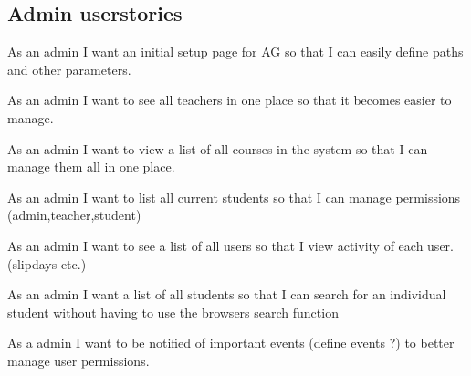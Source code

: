 \begin{appendices}
\begin{itemize*}
\subsection*{Admin userstories}
\item As an admin I want an initial setup page for AG so that I can easily define paths and other parameters.
\item As an admin I want to see all teachers in one place so that it becomes easier to manage.
\item As an admin I want to view a list of all courses in the system so that I can manage them all in one place.
\item As an admin I want to list all current students so that I can manage permissions (admin,teacher,student)
\item As an admin I want to see a list of all users so that I view activity of each user. (slipdays etc.)
\item As an admin I want a list of all students so that I can search for an individual student without having to use the browsers search function
\item As a admin I want to be notified of important events (define events ?) to better manage user permissions.


\end{itemize*}
\end{appendices}
